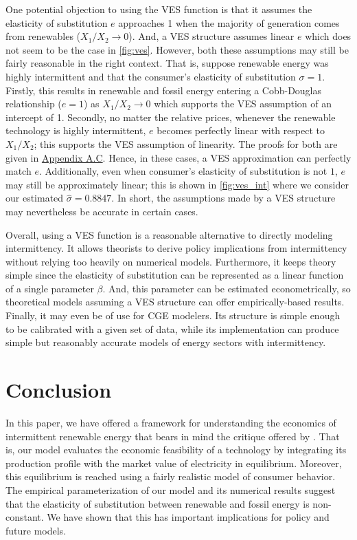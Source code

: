 \documentclass[11pt,a4paper,leqno]{extarticle}
\begin{document}
	
	One potential objection to using the VES function is that it assumes the elasticity of substitution $e$ approaches 1 when the majority of generation comes from renewables ($X_1/X_2 \to 0$). And, a VES structure assumes linear $e$ which does not seem to be the case in \autoref{fig:ves}. However, both these assumptions may still be fairly reasonable in the right context. That is, suppose renewable energy was highly intermittent and that the consumer's elasticity of substitution $\sigma = 1$. Firstly, this results in renewable  and fossil energy entering a Cobb-Douglas relationship ($e = 1$) as $X_1/X_2 \to 0$ which supports the VES assumption of an intercept of 1. Secondly, no matter the relative prices, whenever the renewable technology is highly intermittent, $e$ becomes perfectly linear with respect to $X_1/X_2$; this supports the VES assumption of linearity. The proofs for both are given in \hyperref[sec:asympeos]{Appendix A.C}. Hence, in these cases, a VES approximation  can perfectly match $e$. Additionally, even when consumer's elasticity of substitution is not $1$, $e$ may still be approximately linear; this is shown in \autoref{fig:ves_int} where we consider our estimated $\hat{\sigma} = 0.8847$. In short, the assumptions made by a VES structure may nevertheless be accurate in certain cases. 
	
	
	
	Overall, using a VES function is a reasonable alternative to directly modeling intermittency. It allows theorists to derive policy implications from intermittency without relying too heavily on numerical models. Furthermore, it keeps theory simple since the elasticity of substitution can be represented as a linear function of a single parameter $\beta$. And, this parameter can be estimated econometrically, so theoretical models assuming a VES structure can offer empirically-based results. Finally, it may even be of use for CGE modelers. Its structure is simple enough to be calibrated with a given set of data, while its implementation can produce simple but reasonably accurate models of energy sectors with intermittency. 
	
	
	
	
	\section{Conclusion}
	
	
	In this paper, we have offered a framework for understanding the economics of intermittent renewable energy that bears in mind the critique offered by \citet{Joskow2011}. That is, our model evaluates the economic feasibility of a technology by integrating its production profile with the market value of electricity in equilibrium. Moreover, this equilibrium is reached using a fairly realistic model of consumer behavior. The empirical parameterization of our model and its numerical results suggest that the elasticity of substitution between renewable and fossil energy is non-constant. We have shown that this has important implications for policy and future models. 
	
\end{document}
